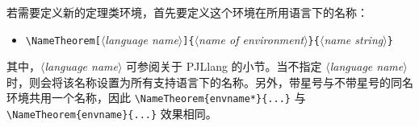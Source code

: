 \documentclass[allowbf,regionalref]{lebhart}
\providecommand{\meta}[1]{$\langle${\normalfont\itshape#1}$\rangle$}
\newenvironment{tip}[1][提示]{%
    \begin{tcolorbox}[breakable,
        enhanced,
        width = \textwidth,
        colback = paper, colbacktitle = paper,
        colframe = gray!50, boxrule=0.2mm,
        coltitle = black,
        fonttitle = \sffamily,
        attach boxed title to top left = {yshift=-\tcboxedtitleheight/2, xshift=.5cm},
        boxed title style = {boxrule=0pt, colframe=paper},
        before skip = 0.3cm,
        after skip = 0.3cm,
        top = 3mm,
        bottom = 3mm,
        title={\scshape\sffamily #1}]%
}{\end{tcolorbox}}
\providecommand{\PJLlang}{\textsf{PJLlang}}
\begin{document}
若需要定义新的定理类环境，首先要定义这个环境在所用语言下的名称：
\vspace{-.15\baselineskip}%
\begin{itemize}
    \item \lstinline|\NameTheorem[|\meta{language name}\lstinline|]{|\meta{name of environment}\lstinline|}{|\meta{name string}\lstinline|}|
\end{itemize}
\vspace{-.15\baselineskip}%
其中，\meta{language name} 可参阅关于 \PJLlang{} 的小节。当不指定 \meta{language name}时，则会将该名称设置为所有支持语言下的名称。另外，带星号与不带星号的同名环境共用一个名称，因此 \lstinline|\NameTheorem{envname*}{...}| 与 \lstinline|\NameTheorem{envname}{...}| 效果相同。
\end{document}
